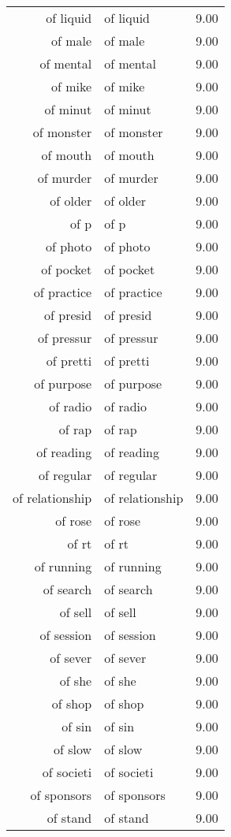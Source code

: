 \begin{table}[ht]
\begin{tabular}{rlr}
  of liquid & of liquid & 9.00 \\ 
  of male & of male & 9.00 \\ 
  of mental & of mental & 9.00 \\ 
  of mike & of mike & 9.00 \\ 
  of minut & of minut & 9.00 \\ 
  of monster & of monster & 9.00 \\ 
  of mouth & of mouth & 9.00 \\ 
  of murder & of murder & 9.00 \\ 
  of older & of older & 9.00 \\ 
  of p & of p & 9.00 \\ 
  of photo & of photo & 9.00 \\ 
  of pocket & of pocket & 9.00 \\ 
  of practice & of practice & 9.00 \\ 
  of presid & of presid & 9.00 \\ 
  of pressur & of pressur & 9.00 \\ 
  of pretti & of pretti & 9.00 \\ 
  of purpose & of purpose & 9.00 \\ 
  of radio & of radio & 9.00 \\ 
  of rap & of rap & 9.00 \\ 
  of reading & of reading & 9.00 \\ 
  of regular & of regular & 9.00 \\ 
  of relationship & of relationship & 9.00 \\ 
  of rose & of rose & 9.00 \\ 
  of rt & of rt & 9.00 \\ 
  of running & of running & 9.00 \\ 
  of search & of search & 9.00 \\ 
  of sell & of sell & 9.00 \\ 
  of session & of session & 9.00 \\ 
  of sever & of sever & 9.00 \\ 
  of she & of she & 9.00 \\ 
  of shop & of shop & 9.00 \\ 
  of sin & of sin & 9.00 \\ 
  of slow & of slow & 9.00 \\ 
  of societi & of societi & 9.00 \\ 
  of sponsors & of sponsors & 9.00 \\ 
  of stand & of stand & 9.00 \\ 

\end{tabular}
\end{table}
